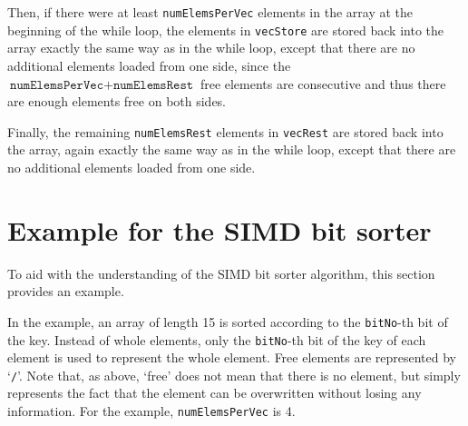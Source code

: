 \documentclass[12pt, a4paper, openright, twoside]{tiarbeit}
\begin{document}
Then, if there were at least \texttt{numElemsPerVec} elements in the array
at the beginning of the while loop, the elements in \texttt{vecStore} are
stored back into the array exactly the same way as in the while
loop, except that there are no additional elements loaded from one side,
since the $\texttt{numElemsPerVec}+\texttt{numElemsRest}$ free elements
are consecutive and thus there are enough elements free on both sides.

Finally, the remaining \texttt{numElemsRest} elements in \texttt{vecRest} are
stored back into the array, again exactly the same way as in the while
loop, except that there are no additional elements loaded from one side.


\section{Example for the SIMD bit sorter}

To aid with the understanding of the SIMD bit sorter algorithm,
this section provides an example.

In the example, an array of length 15 is sorted according to the
\texttt{bitNo}-th bit of the key. Instead of whole elements,
only the \texttt{bitNo}-th bit of the key
of each element is used to represent the whole element.
Free elements are represented by `{\tiny \texttt{/}}'. Note that, as above,
`free' does not mean that there is no element, but simply
represents the fact that the element can be overwritten without losing
any information.
For the example, \texttt{numElemsPerVec} is 4.
\end{document}
